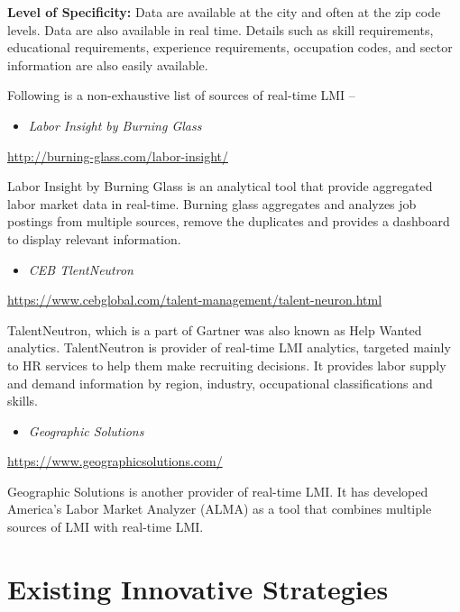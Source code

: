 \documentclass[]{book}
\providecommand{\tightlist}{%
  \setlength{\itemsep}{0pt}\setlength{\parskip}{0pt}}
\theoremstyle{definition}
\theoremstyle{definition}
\theoremstyle{definition}
\theoremstyle{remark}
\begin{document}
\textbf{Level of Specificity:} Data are available at the city and often
at the zip code levels. Data are also available in real time. Details
such as skill requirements, educational requirements, experience
requirements, occupation codes, and sector information are also easily
available.

Following is a non-exhaustive list of sources of real-time LMI --

\begin{itemize}
\tightlist
\item
  \emph{Labor Insight by Burning Glass}
\end{itemize}

\url{http://burning-glass.com/labor-insight/}

Labor Insight by Burning Glass is an analytical tool that provide
aggregated labor market data in real-time. Burning glass aggregates and
analyzes job postings from multiple sources, remove the duplicates and
provides a dashboard to display relevant information.

\begin{itemize}
\tightlist
\item
  \emph{CEB TlentNeutron}
\end{itemize}

\url{https://www.cebglobal.com/talent-management/talent-neuron.html}

TalentNeutron, which is a part of Gartner was also known as Help Wanted
analytics. TalentNeutron is provider of real-time LMI analytics,
targeted mainly to HR services to help them make recruiting decisions.
It provides labor supply and demand information by region, industry,
occupational classifications and skills.

\begin{itemize}
\tightlist
\item
  \emph{Geographic Solutions}
\end{itemize}

\url{https://www.geographicsolutions.com/}

Geographic Solutions is another provider of real-time LMI. It has
developed America's Labor Market Analyzer (ALMA) as a tool that combines
multiple sources of LMI with real-time LMI.

\chapter{Existing Innovative
Strategies}\label{existing-innovative-strategies}
\end{document}

